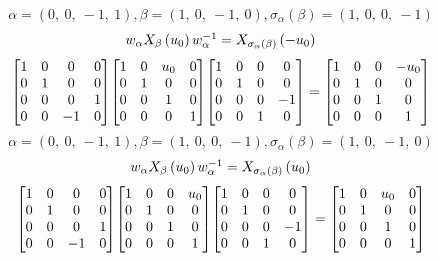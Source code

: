 \documentclass[11pt]{article}
\theoremstyle{definition}
\begin{document}
\[
\alpha = \left( 0, \  0, \  -1, \  1\right), \beta = \left( 1, \  0, \  -1, \  0\right), \sigma_{\alpha}(\beta) = \left( 1, \  0, \  0, \  -1\right)
\]
\[
\scaletoalign{\textwidth}{w_{\alpha} X_{\beta}\left(u_{0}\right) w_{\alpha}^{-1} = X_{\sigma_{\alpha}\left(\beta\right)}\left(- u_{0}\right)}
\]
\[
\scaletoalign{\textwidth}{{\left[\begin{matrix}1 & 0 & 0 & 0\\0 & 1 & 0 & 0\\0 & 0 & 0 & 1\\0 & 0 & -1 & 0\end{matrix}\right]} {\left[\begin{matrix}1 & 0 & u_{0} & 0\\0 & 1 & 0 & 0\\0 & 0 & 1 & 0\\0 & 0 & 0 & 1\end{matrix}\right]} {\left[\begin{matrix}1 & 0 & 0 & 0\\0 & 1 & 0 & 0\\0 & 0 & 0 & -1\\0 & 0 & 1 & 0\end{matrix}\right]} = {\left[\begin{matrix}1 & 0 & 0 & - u_{0}\\0 & 1 & 0 & 0\\0 & 0 & 1 & 0\\0 & 0 & 0 & 1\end{matrix}\right]}}
\]
\[
\alpha = \left( 0, \  0, \  -1, \  1\right), \beta = \left( 1, \  0, \  0, \  -1\right), \sigma_{\alpha}(\beta) = \left( 1, \  0, \  -1, \  0\right)
\]
\[
\scaletoalign{\textwidth}{w_{\alpha} X_{\beta}\left(u_{0}\right) w_{\alpha}^{-1} = X_{\sigma_{\alpha}\left(\beta\right)}\left(u_{0}\right)}
\]
\[
\scaletoalign{\textwidth}{{\left[\begin{matrix}1 & 0 & 0 & 0\\0 & 1 & 0 & 0\\0 & 0 & 0 & 1\\0 & 0 & -1 & 0\end{matrix}\right]} {\left[\begin{matrix}1 & 0 & 0 & u_{0}\\0 & 1 & 0 & 0\\0 & 0 & 1 & 0\\0 & 0 & 0 & 1\end{matrix}\right]} {\left[\begin{matrix}1 & 0 & 0 & 0\\0 & 1 & 0 & 0\\0 & 0 & 0 & -1\\0 & 0 & 1 & 0\end{matrix}\right]} = {\left[\begin{matrix}1 & 0 & u_{0} & 0\\0 & 1 & 0 & 0\\0 & 0 & 1 & 0\\0 & 0 & 0 & 1\end{matrix}\right]}}
\]
\end{document}
